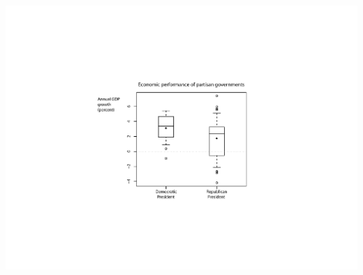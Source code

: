\documentclass[pdflatex,landscape,titlepage]{foils}
\begin{document}
\begin{center}

\includegraphics[width=9 in]{gdpbox1}

\end{center}
\end{document}
